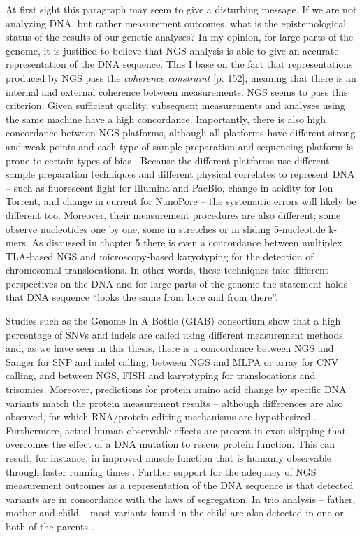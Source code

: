 At first sight this paragraph may seem to give a disturbing message. 
If we are not analyzing DNA, but rather measurement outcomes, what is the epistemological status of the results of our genetic analyses? 
In my opinion, for large parts of the genome, it is justified to believe that NGS analysis is able to give an accurate representation of the DNA sequence. 
This I base on the fact that representations produced by NGS pass the \textsl{coherence constraint} [p. 152], meaning that there is an internal and external coherence between measurements. 
NGS seems to pass this criterion. 
Given sufficient quality, subsequent measurements and analyses using the same machine have a high concordance. 
Importantly, there is also high concordance between NGS platforms, although all platforms have different strong and weak points \cite{Rieber_2013} and each type of sample preparation and sequencing platform is prone to certain types of bias \cite{Aird_2011,Ross_2013}. 
Because the different platforms use different sample preparation techniques and different physical correlates to represent DNA – such as fluorescent light for Illumina and PacBio, change in acidity for Ion Torrent, and change in current for NanoPore – the systematic errors will likely be different too. 
Moreover, their measurement procedures are also different; some observe nucleotides one by one, some in stretches or in sliding 5-nucleotide k-mers. 
As discussed in chapter 5 there is even a concordance between multiplex TLA-based NGS and microscopy-based karyotyping for the detection of chromosomal translocations. 
In other words, these techniques take different perspectives on the DNA and for large parts of the genome the statement holds that DNA sequence “looks the same from here and from there”.

Studies such as the Genome In A Bottle (GIAB) consortium show that a high percentage of SNVs and indels are called using different measurement methods \cite{Zook_2018} and, as we have seen in this thesis, there is a concordance between NGS and Sanger for SNP and indel calling, between NGS and MLPA or array for CNV calling, and between NGS, FISH and karyotyping for translocations and trisomies. 
Moreover, predictions for protein amino acid change by specific DNA variants match the protein measurement results – although differences are also observed, for which RNA/protein editing mechanisms are hypothesized \cite{Wu_2012}. 
Furthermore, actual human-observable effects are present in exon-skipping that overcomes the effect of a DNA mutation to rescue protein function. 
This can result, for instance, in improved muscle function that is humanly observable through faster running times \cite{Miskew_Nichols_2016}. 
Further support for the adequacy of NGS measurement outcomes as a representation of the DNA sequence is that detected variants are in concordance with the laws of segregation. 
In trio analysis – father, mother and child – most variants found in the child are also detected in one or both of the parents \cite{Francioli_2014}. 

